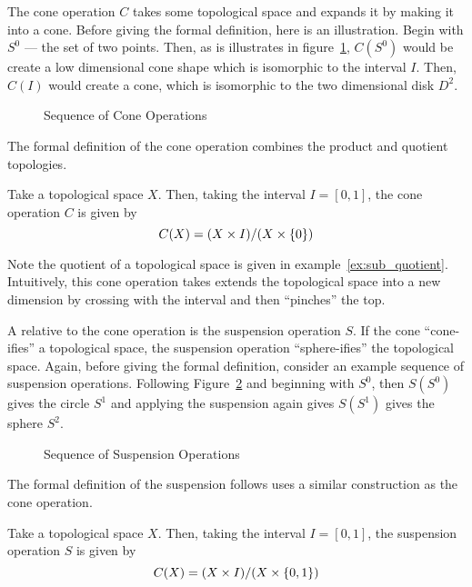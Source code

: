 \documentclass[../sean_thesis.tex]{subfiles}
\begin{document}
The cone operation $C$ takes some topological space and expands it by making it into a cone. Before giving the formal definition, here is an illustration. Begin with  $S^0$ --- the set of two points. Then, as is illustrates in figure~\ref{fig:cone}, $C(S^0)$ would be create a low dimensional cone shape which is isomorphic to the interval $I$. Then, $C(I)$ would create a cone, which is isomorphic to the two dimensional disk $D^2$.

\begin{figure}
	\caption{Sequence of Cone Operations}
	\label{fig:cone}
\end{figure}
 
The formal definition of the cone operation combines the product and quotient topologies.
\begin{definition}
	Take a topological space $X$. Then, taking the interval $I = [0,1]$, the cone operation $C$ is given by
	\begin{equation*}
		C(X) = (X \times I)/(X \times \left\{0\right\})
	\end{equation*}
\end{definition}
Note the quotient of a topological space is given in example~\ref{ex:sub_quotient}. Intuitively, this cone operation takes extends the topological space into a new dimension by crossing with the interval and then ``pinches'' the top.
 
A relative to the cone operation is the suspension operation $S$. If the cone ``cone-ifies'' a topological space, the suspension operation ``sphere-ifies'' the topological space. Again, before giving the formal definition, consider an example sequence of suspension operations. Following Figure~\ref{fig:suspension} and beginning with $S^0$, then $S(S^0)$ gives the circle $S^1$ and applying the suspension again gives $S(S^1)$ gives the sphere $S^2$.

\begin{figure}
\caption{Sequence of Suspension Operations}
\label{fig:suspension}
\end{figure}

The formal definition of the suspension follows uses a similar construction as the cone operation.

\begin{definition}
	Take a topological space $X$. Then, taking the interval $I = [0,1]$, the suspension operation $S$ is given by
	\begin{equation*}
		C(X) = (X \times I)/(X \times \left\{0,1\right\})
	\end{equation*}
\end{definition}
\end{document}
